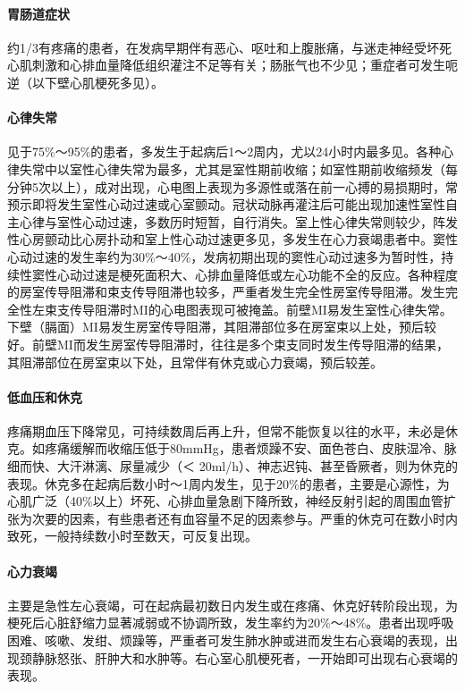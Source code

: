 \paragraph{胃肠道症状}

约1/3有疼痛的患者，在发病早期伴有恶心、呕吐和上腹胀痛，与迷走神经受坏死心肌刺激和心排血量降低组织灌注不足等有关；肠胀气也不少见；重症者可发生呃逆（以下壁心肌梗死多见）。

\paragraph{心律失常}

见于75\%～95\%的患者，多发生于起病后1～2周内，尤以24小时内最多见。各种心律失常中以室性心律失常为最多，尤其是室性期前收缩；如室性期前收缩频发（每分钟5次以上），成对出现，心电图上表现为多源性或落在前一心搏的易损期时，常预示即将发生室性心动过速或心室颤动。冠状动脉再灌注后可能出现加速性室性自主心律与室性心动过速，多数历时短暂，自行消失。室上性心律失常则较少，阵发性心房颤动比心房扑动和室上性心动过速更多见，多发生在心力衰竭患者中。窦性心动过速的发生率约为30\%～40\%，发病初期出现的窦性心动过速多为暂时性，持续性窦性心动过速是梗死面积大、心排血量降低或左心功能不全的反应。各种程度的房室传导阻滞和束支传导阻滞也较多，严重者发生完全性房室传导阻滞。发生完全性左束支传导阻滞时MI的心电图表现可被掩盖。前壁MI易发生室性心律失常。下壁（膈面）MI易发生房室传导阻滞，其阻滞部位多在房室束以上处，预后较好。前壁MI而发生房室传导阻滞时，往往是多个束支同时发生传导阻滞的结果，其阻滞部位在房室束以下处，且常伴有休克或心力衰竭，预后较差。

\paragraph{低血压和休克}

疼痛期血压下降常见，可持续数周后再上升，但常不能恢复以往的水平，未必是休克。如疼痛缓解而收缩压低于80mmHg，患者烦躁不安、面色苍白、皮肤湿冷、脉细而快、大汗淋漓、尿量减少（＜
20ml/h）、神志迟钝、甚至昏厥者，则为休克的表现。休克多在起病后数小时～1周内发生，见于20\%的患者，主要是心源性，为心肌广泛（40\%以上）坏死、心排血量急剧下降所致，神经反射引起的周围血管扩张为次要的因素，有些患者还有血容量不足的因素参与。严重的休克可在数小时内致死，一般持续数小时至数天，可反复出现。

\paragraph{心力衰竭}

主要是急性左心衰竭，可在起病最初数日内发生或在疼痛、休克好转阶段出现，为梗死后心脏舒缩力显著减弱或不协调所致，发生率约为20\%～48\%。患者出现呼吸困难、咳嗽、发绀、烦躁等，严重者可发生肺水肿或进而发生右心衰竭的表现，出现颈静脉怒张、肝肿大和水肿等。右心室心肌梗死者，一开始即可出现右心衰竭的表现。

